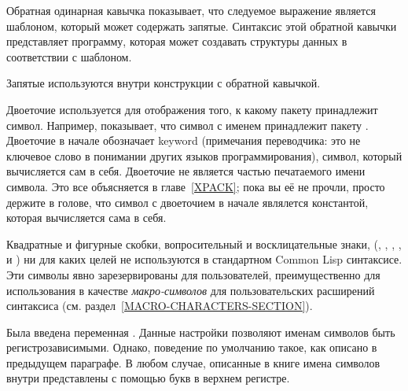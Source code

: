 \begin{indentdesc}{1.2pc}
\item[\cd{{\Xbq}}] Обратная одинарная кавычка показывает, что следуемое
выражение является шаблоном, который может содержать запятые. Синтаксис этой
обратной кавычки представляет программу, которая может создавать структуры
данных в соответствии с шаблоном.

\item[\cd{,}] Запятые используются внутри конструкции с обратной кавычкой.

\item[\cd{:}] Двоеточие используется для отображения того, к какому пакету
принадлежит символ. Например,  показывает, что символ с
именем  принадлежит пакету . Двоеточие в начале обозначает 
keyword (примечания переводчика: это не ключевое слово в понимании других языков 
программирования), символ, который вычисляется сам в себя. Двоеточие не является
частью печатаемого имени символа. 
Это все объясняется в главе~\ref{XPACK}; пока вы её не прочли, просто держите в
голове, что символ с двоеточием в начале являлется константой, которая
вычисляется сама в себя.
\end{indentdesc}

Квадратные и фигурные скобки, вопросительный и восклицательные знаки,
(\cd{{\Xlbracket}}, \cd{{\Xrbracket}}, \cd{{\Xlbrace}}, \cd{{\Xrbrace}}, 
и  \cd{!}) ни для каких целей не используются в стандартном Common Lisp 
синтаксисе. Эти символы явно зарезервированы для пользователей, преимущественно
для использования в качестве \emph{макро-символов} для пользовательских расширений
синтаксиса (см. раздел~\ref{MACRO-CHARACTERS-SECTION}).

Была введена переменная . Данные настройки позволяют именам символов быть
регистрозависимыми. Однако, поведение по умолчанию такое, как описано в
предыдущем параграфе. В любом случае, описанные в книге имена символов внутри
представлены с помощью букв в верхнем регистре.
\fi